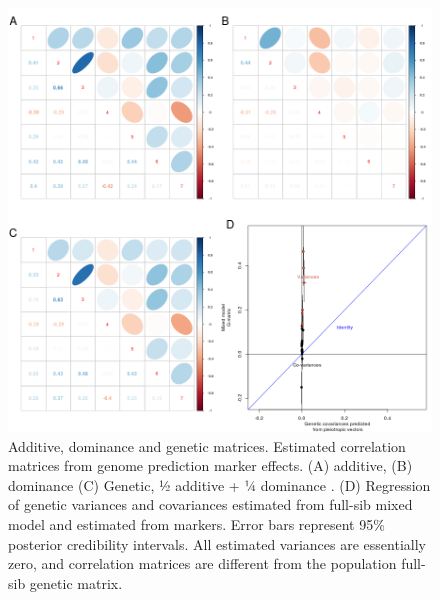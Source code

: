 \begin{refsection}
\begin{figure}
	\includegraphics[width=\linewidth]{chapter_JoH-Melo_etal/media/growth_cov_prediction_composite_GP.png}
	\caption[Additive, dominance and genetic matrices]{Additive, dominance and genetic matrices.
	Estimated correlation matrices from genome prediction marker effects. (A)
additive, (B) dominance (C) Genetic, ½ additive + ¼ dominance . (D)
Regression of genetic variances and covariances estimated from full-sib
mixed model and estimated from markers. Error bars represent 95\%
posterior credibility intervals. All estimated variances are essentially
zero, and correlation matrices are different from the population
full-sib genetic matrix.}
\label{fig:joh:covGP}
\end{figure}

\end{refsection}
